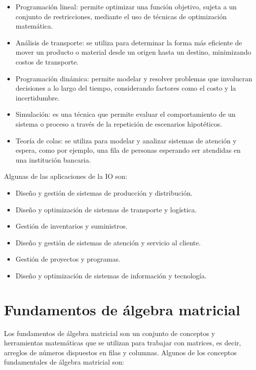 \documentclass[
  letterpaper,
  DIV=11,
  numbers=noendperiod]{scrreprt}
\providecommand{\tightlist}{%
  \setlength{\itemsep}{0pt}\setlength{\parskip}{0pt}}\usepackage{longtable,booktabs,array}
\theoremstyle{definition}
\theoremstyle{definition}
\theoremstyle{remark}
\begin{document}
\begin{itemize}
\tightlist
\item
  Programación lineal: permite optimizar una función objetivo, sujeta a
  un conjunto de restricciones, mediante el uso de técnicas de
  optimización matemática.
\item
  Análisis de transporte: se utiliza para determinar la forma más
  eficiente de mover un producto o material desde un origen hasta un
  destino, minimizando costos de transporte.
\item
  Programación dinámica: permite modelar y resolver problemas que
  involucran decisiones a lo largo del tiempo, considerando factores
  como el costo y la incertidumbre.
\item
  Simulación: es una técnica que permite evaluar el comportamiento de un
  sistema o proceso a través de la repetición de escenarios hipotéticos.
\item
  Teoría de colas: se utiliza para modelar y analizar sistemas de
  atención y espera, como por ejemplo, una fila de personas esperando
  ser atendidas en una institución bancaria.
\end{itemize}

Algunas de las aplicaciones de la IO son:

\begin{itemize}
\tightlist
\item
  Diseño y gestión de sistemas de producción y distribución.
\item
  Diseño y optimización de sistemas de transporte y logística.
\item
  Gestión de inventarios y suministros.
\item
  Diseño y gestión de sistemas de atención y servicio al cliente.
\item
  Gestión de proyectos y programas.
\item
  Diseño y optimización de sistemas de información y tecnología.
\end{itemize}

\hypertarget{fundamentos-de-uxe1lgebra-matricial}{%
\section{Fundamentos de álgebra
matricial}\label{fundamentos-de-uxe1lgebra-matricial}}

Los fundamentos de álgebra matricial son un conjunto de conceptos y
herramientas matemáticas que se utilizan para trabajar con matrices, es
decir, arreglos de números dispuestos en filas y columnas. Algunos de
los conceptos fundamentales de álgebra matricial son:
\end{document}
